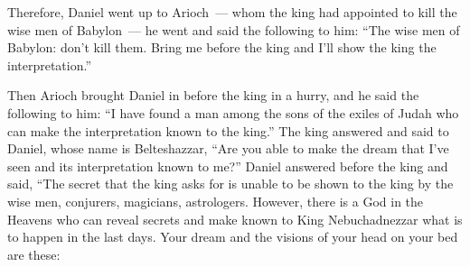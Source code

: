 \begin{inparaenum}
    
    
    
    
    
    
    
    
    
    \noindent{} Therefore, Daniel went up to Arioch~--- whom the king had appointed to kill the wise men of Babylon~--- he went and said the following to him: ``The wise men of Babylon: don't kill them. Bring me before the king and I'll show the king the interpretation.''%
    
     Then Arioch brought Daniel in before the king in a hurry, and he said the following to him: ``I have found a man among the sons of the exiles of Judah who can make the interpretation known to the king.''%
     The king answered and said to Daniel, whose name is Belteshazzar, ``Are you able to make the dream that I've seen and its interpretation known to me?''%
     Daniel answered before the king and said, ``The secret that the king asks for is unable to be shown to the king by the wise men, conjurers, magicians, astrologers.%
     However, there is a God in the Heavens who can reveal secrets and make known to King Nebuchadnezzar what is to happen in the last days. Your dream and the visions of your head on your bed are these:%
    

\end{inparaenum}
